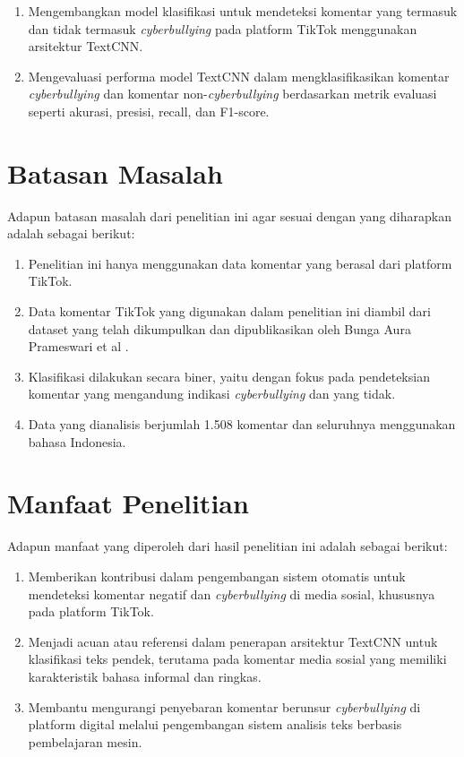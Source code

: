 \begin{enumerate}[noitemsep]
    \item Mengembangkan model klasifikasi untuk mendeteksi komentar yang termasuk dan tidak termasuk \textit{cyberbullying} pada platform TikTok menggunakan arsitektur TextCNN.
    \item Mengevaluasi performa model TextCNN dalam mengklasifikasikan komentar \textit{cyberbullying} dan komentar non-\textit{cyberbullying} berdasarkan metrik evaluasi seperti akurasi, presisi, recall, dan F1-score.
\end{enumerate}


\section{Batasan Masalah} \label{I.Batasan}
Adapun batasan masalah dari penelitian ini agar sesuai dengan yang diharapkan adalah sebagai berikut: \par

\begin{enumerate}[noitemsep]
    \item Penelitian ini hanya menggunakan data komentar yang berasal dari platform TikTok.
    \item Data komentar TikTok yang digunakan dalam penelitian ini diambil dari dataset yang telah dikumpulkan dan dipublikasikan oleh Bunga Aura Prameswari et al \cite{10468424}.
    \item Klasifikasi dilakukan secara biner, yaitu dengan fokus pada pendeteksian komentar yang mengandung indikasi \textit{cyberbullying} dan yang tidak.
    \item Data yang dianalisis berjumlah 1.508 komentar dan seluruhnya menggunakan bahasa Indonesia.
\end{enumerate}

\section{Manfaat Penelitian} \label{I.Manfaat}
Adapun manfaat yang diperoleh dari hasil penelitian ini adalah sebagai berikut: \par

\begin{enumerate}[noitemsep]
    \item Memberikan kontribusi dalam pengembangan sistem otomatis untuk mendeteksi komentar negatif dan \textit{cyberbullying} di media sosial, khususnya pada platform TikTok.
    \item Menjadi acuan atau referensi dalam penerapan arsitektur TextCNN untuk klasifikasi teks pendek, terutama pada komentar media sosial yang memiliki karakteristik bahasa informal dan ringkas.
    \item Membantu mengurangi penyebaran komentar berunsur \textit{cyberbullying} di platform digital melalui pengembangan sistem analisis teks berbasis pembelajaran mesin.
\end{enumerate}


